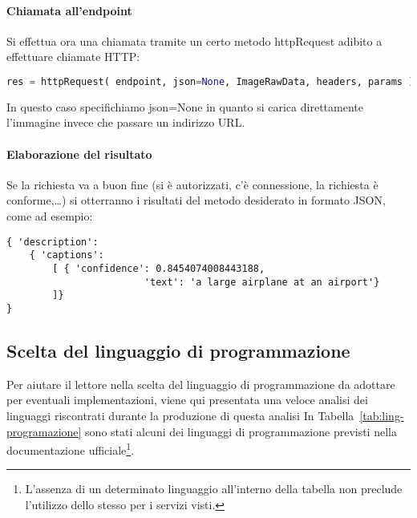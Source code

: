\paragraph{Chiamata all'endpoint}
Si effettua ora una chiamata tramite un certo metodo \textsf{httpRequest} adibito a
effettuare chiamate HTTP:
%
\begin{lstlisting}[language=Python,style=mystyle]
res = httpRequest( endpoint, json=None, ImageRawData, headers, params )
\end{lstlisting}
In questo caso specifichiamo \textsf{json=None} in quanto si carica direttamente l'immagine
invece che passare un indirizzo URL.
%
\paragraph{Elaborazione del risultato}
Se la richiesta va a buon fine (si è autorizzati, c'è connessione, la richiesta è conforme,\ldots)
si otterranno i risultati del metodo desiderato in formato JSON, come ad esempio:
\begin{lstlisting}[style=myJSON]
{ 'description':
	{ 'captions':
		[ { 'confidence': 0.8454074008443188,
						'text': 'a large airplane at an airport'}
		]}
}
\end{lstlisting}
%
\subsection{Scelta del linguaggio di programmazione}\label{subsec:scelta-linguaggio}
Per aiutare il lettore nella scelta del linguaggio di programmazione
da adottare per eventuali implementazioni, viene qui presentata una veloce analisi dei linguaggi
riscontrati durante la produzione di questa analisi
In Tabella~\ref{tab:ling-programazione} sono stati alcuni dei linguaggi
di programmazione previsti nella documentazione ufficiale\footnote{L'assenza di un determinato linguaggio
all'interno della tabella non preclude l'utilizzo dello stesso per i servizi visti.}.


